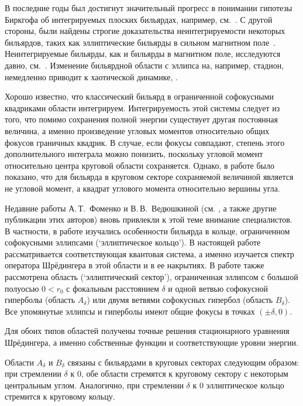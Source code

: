 
{\actuality} 
В последние годы был достигнут значительный прогресс в понимании гипотезы Биркгофа об интегрируемых плоских бильярдах, например, см.~\cite{bm2022}.
С другой стороны, были найдены строгие доказательства неинтегрируемости некоторых бильярдов, таких как эллиптические бильярды в сильном магнитном поле~\cite{bm2020, bm2019}. Неинтегрируемые бильярды, как и бильярды в магнитном поле, исследуются давно, см.~\cite{berry1985, berry1986}.
Изменение бильярдной области с эллипса на, например, стадион, немедленно приводит к хаотической динамике, \cite{bunimovich1974, stockmann2000}.

Хорошо известно, что классический бильярд в ограниченной софокусными квадриками области интегрируем. Интегрируемость  этой системы следует из того, что помимо сохранения полной энергии существует другая постоянная величина, а именно произведение угловых моментов относительно общих фокусов граничных квадрик.
В случае, если фокусы совпадают, степень этого дополнительного интеграла можно понизить, поскольку угловой момент относительно центра круговой области сохраняется.
Однако, в работе \cite{wref13} было показано, что для бильярда в круговом секторе сохраняемой величиной является не  угловой момент, а квадрат углового момента относительно вершины угла.


Недавние работы А.\,Т.~Фоменко и В.\,В.~Ведюшкиной (см. \cite{wref6,wref7,wref8} , а также другие публикации этих авторов) вновь привлекли к этой теме внимание специалистов. 
В частности, в работе \cite{wref6} изучались особенности бильярда в кольце, ограниченном софокусными эллипсами (`эллиптическое кольцо'). В настоящей работе рассматривается соответствующая квантовая система, а именно изучается спектр оператора Шрёдингера в этой области и в ее накрытиях. 
В работе также рассмотрена область (`эллиптический сектор'), ограниченная эллипсом с большой полуосью $0 <r_0$ с фокальным расстоянием $\delta$ и 
одной ветвью софокусной гиперболы  (область $A_\delta$)
или двумя ветвями софокусных гипербол (область $B_\delta$).
Все упомянутые эллипсы и гиперболы имеют общие фокусы в точках $(\pm \delta, 0)$.

Для обоих типов областей получены точные решения стационарного уравнения Шрёдингера, а именно собственные функции и соответствующие уровни энергии.

Области $A_\delta$ и $B_\delta$ связаны с бильярдами в круговых секторах следующим образом: при стремлении $\delta$ к 0, обе области стремятся к круговому сектору с некоторым центральным углом. Аналогично, при стремлении $\delta$ к 0 эллиптическое кольцо стремится к круговому кольцу. 

